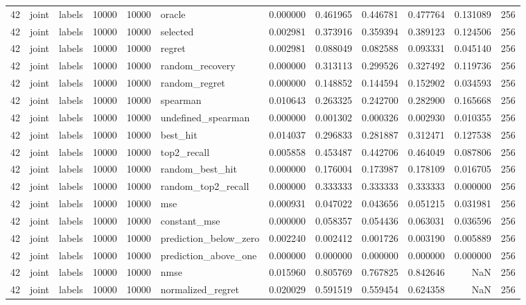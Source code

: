 \begin{tabular}{rllrrlrrrrrr}
42 & joint & labels & 10000 & 10000 & oracle & 0.000000 & 0.461965 & 0.446781 & 0.477764 & 0.131089 & 256 \\
42 & joint & labels & 10000 & 10000 & selected & 0.002981 & 0.373916 & 0.359394 & 0.389123 & 0.124506 & 256 \\
42 & joint & labels & 10000 & 10000 & regret & 0.002981 & 0.088049 & 0.082588 & 0.093331 & 0.045140 & 256 \\
42 & joint & labels & 10000 & 10000 & random_recovery & 0.000000 & 0.313113 & 0.299526 & 0.327492 & 0.119736 & 256 \\
42 & joint & labels & 10000 & 10000 & random_regret & 0.000000 & 0.148852 & 0.144594 & 0.152902 & 0.034593 & 256 \\
42 & joint & labels & 10000 & 10000 & spearman & 0.010643 & 0.263325 & 0.242700 & 0.282900 & 0.165668 & 256 \\
42 & joint & labels & 10000 & 10000 & undefined_spearman & 0.000000 & 0.001302 & 0.000326 & 0.002930 & 0.010355 & 256 \\
42 & joint & labels & 10000 & 10000 & best_hit & 0.014037 & 0.296833 & 0.281887 & 0.312471 & 0.127538 & 256 \\
42 & joint & labels & 10000 & 10000 & top2_recall & 0.005858 & 0.453487 & 0.442706 & 0.464049 & 0.087806 & 256 \\
42 & joint & labels & 10000 & 10000 & random_best_hit & 0.000000 & 0.176004 & 0.173987 & 0.178109 & 0.016705 & 256 \\
42 & joint & labels & 10000 & 10000 & random_top2_recall & 0.000000 & 0.333333 & 0.333333 & 0.333333 & 0.000000 & 256 \\
42 & joint & labels & 10000 & 10000 & mse & 0.000931 & 0.047022 & 0.043656 & 0.051215 & 0.031981 & 256 \\
42 & joint & labels & 10000 & 10000 & constant_mse & 0.000000 & 0.058357 & 0.054436 & 0.063031 & 0.036596 & 256 \\
42 & joint & labels & 10000 & 10000 & prediction_below_zero & 0.002240 & 0.002412 & 0.001726 & 0.003190 & 0.005889 & 256 \\
42 & joint & labels & 10000 & 10000 & prediction_above_one & 0.000000 & 0.000000 & 0.000000 & 0.000000 & 0.000000 & 256 \\
42 & joint & labels & 10000 & 10000 & nmse & 0.015960 & 0.805769 & 0.767825 & 0.842646 & NaN & 256 \\
42 & joint & labels & 10000 & 10000 & normalized_regret & 0.020029 & 0.591519 & 0.559454 & 0.624358 & NaN & 256 \\

\end{tabular}
